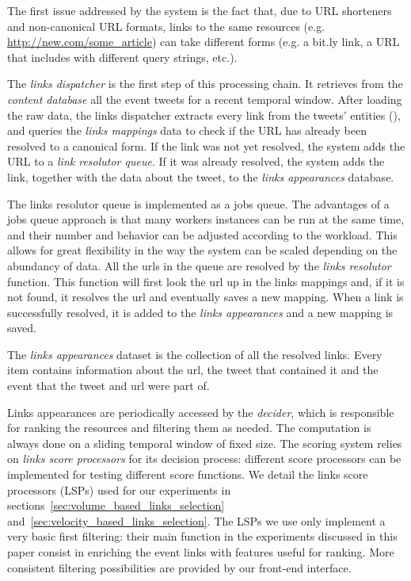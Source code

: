 \documentclass{sig-alternate}
\begin{document}
The first issue addressed by the system is the fact that, due to URL shorteners and non-canonical URL formats, links to the same resources (e.g. \url{http://new.com/some\_article}) can take different forms (e.g. a bit.ly link, a URL that includes with different query strings, etc.).

The \emph{links dispatcher} is the first step of this processing chain. It retrieves from the \emph{content database} all the event tweets for a recent temporal window. After loading the raw data, the links dispatcher extracts every link from the tweets' entities (\cite{RestTweetsDoc}), and queries the \emph{links mappings} data to check if the URL has already been resolved to a canonical form. If the link was not yet resolved, the system adds the URL to a \emph{link resolutor queue}. If it was already resolved, the system adds the link, together with the data about the tweet, to the \emph{links appearances} database.

The links resolutor queue is implemented as a jobs queue\cite{RedisQueues}. The advantages of a jobs queue approach is that many workers instances can be run at the same time, and their number and behavior can be adjusted according to the workload. This allows for great flexibility in the way the system can be scaled depending on the abundancy of data.
All the urls in the queue are resolved by the \emph{links resolutor} function. This function will first look the url up in the links mappings and, if it is not found, it resolves the url and eventually saves a new mapping. When a link is successfully resolved, it is added to the \emph{links appearances} and a new mapping is saved.

The \emph{links appearances} dataset is the collection of all the resolved links. Every item contains information about the url, the tweet that contained it and the event that the tweet and url were part of. %

Links appearances are periodically accessed by the \emph{decider}, which is responsible for ranking the resources and filtering them as needed. The computation is always done on a sliding temporal window of fixed size. The scoring system relies on \emph{links score processors} for its decision process: different score processors can be implemented for testing different score functions. We detail the links score processors (LSPs) used for our experiments in sections~\ref{sec:volume_based_links_selection} and~\ref{sec:velocity_based_links_selection}. The LSPs we use only implement a very basic first filtering: their main function in the experiments discussed in this paper consist in enriching the event links with features useful for ranking. More consistent filtering possibilities are provided by our front-end interface.
\end{document}
